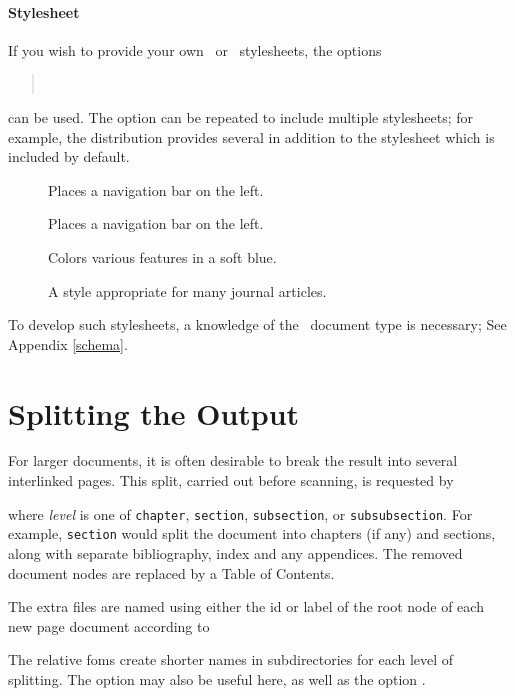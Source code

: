 \documentclass{book}
\begin{document}
\paragraph{Stylesheet}
If you wish to provide your own \XSLT\  or
\CSS\ stylesheets, the options 
\begin{quote}
\\
\end{quote}
 can be used.  The  option can be repeated to include multiple stylesheets;
for example, the distribution provides several in addition to the  stylesheet
which is included by default.
\begin{description}
\item[] Places a navigation bar on the left.
\item[] Places a navigation bar on the left.
\item[] Colors various features in a soft blue.
\item[] A style appropriate for many journal articles.
\end{description}

To develop such stylesheets, a knowledge
of the \LaTeXML\ document type is necessary; See Appendix \ref{schema}.

\section[Splitting]{Splitting the Output}\label{usage.multiple}
For larger documents, it is often desirable to break the 
result into several interlinked pages. This split,
carried out before scanning, is requested by 
\begin{quote}
\end{quote}
where \textit{level} is one of \texttt{chapter},
\texttt{section}, \texttt{subsection}, or \texttt{subsubsection}.
For example, \texttt{section} would split the document into
chapters (if any) and sections, along with separate
bibliography, index and any appendices.
The removed document nodes are replaced by a Table of Contents.

The extra files are named using either the id or label
of the root node of each new page document according to
\begin{quote}
\end{quote}
The relative foms create shorter names in subdirectories for each
level of splitting.
The  option may also be useful here,
as well as the  option .
\end{document}
